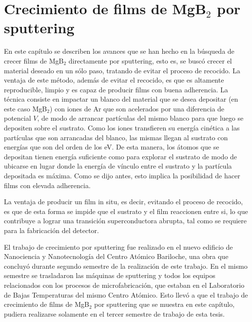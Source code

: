 \chapter{Crecimiento de films de MgB$_2$ por sputtering}\label{C:sput}
\graphicspath{{figs/sput/}}
En este capítulo se describen los avances que se han hecho en la búsqueda de crecer films de MgB$_{2}$ directamente por sputtering, esto es, se buscó crecer el material deseado en un sólo paso, tratando de evitar el proceso de recocido. La ventaja de este método, además de evitar el recocido, es que es altamente reproducible, limpio y es capaz de producir films con buena adherencia. La técnica consiste en impactar un blanco del material que se desea depositar (en este caso MgB$_{2}$) con iones de Ar que son acelerados por una diferencia de potencial $V$, de modo de arrancar partículas del mismo blanco para que luego se depositen sobre el sustrato. Como los iones transfieren su energía cinética a las partículas que son arrancadas del blanco, las mismas llegan al sustrato con energías que son del orden de los eV. De esta manera, los átomos que se depositan tienen energía suficiente como para explorar el sustrato de modo de ubicarse en lugar donde la energía de vínculo entre el sustrato y la partícula depositada es máxima. Como se dijo antes, esto implica la posibilidad de hacer films con elevada adherencia.

La ventaja de producir un film in situ, es decir, evitando el proceso de recocido, es que de esta forma se impide que el sustrato y el film reaccionen entre si, lo que contribuye a lograr una transición superconductora abrupta, tal como se requiere para la fabricación del detector.

El trabajo de crecimiento por sputtering fue realizado en el nuevo edificio de Nanociencia y Nanotecnología del Centro Atómico Bariloche, una obra que concluyó durante segundo semestre de la realización de este trabajo. En el mismo semestre se trasladaron las máquinas de sputtering y todos los equipos relacionados con los procesos de microfabricación, que estaban en el Laboratorio de Bajas Temperaturas del mismo Centro Atómico. Esto llevó a que el trabajo de crecimiento de films de MgB$_2$ por sputtering que se muestra en este capítulo, pudiera realizarse solamente en el tercer semestre de trabajo de esta tesis.
